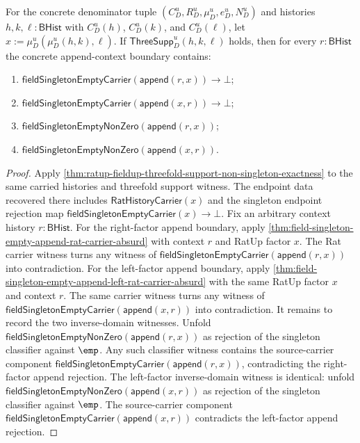 \begin{theorem}
\label{thm:ratup-fieldup-threefold-support-contextual-nonzero-boundary}
For the concrete denominator tuple $(C_D^u,R_D^u,\mu_D^u,e_D^u,N_D^u)$ and histories $h,k,\ell:\mathsf{BHist}$ with $C_D^u(h)$, $C_D^u(k)$, and
$C_D^u(\ell)$, let $x:=\mu_D^u(\mu_D^u(h,k),\ell)$. If
$\mathsf{ThreeSupp}_D^u(h,k,\ell)$ holds, then for every $r:\mathsf{BHist}$ the
concrete append-context boundary contains:
\begin{enumerate}
  \item $\mathsf{fieldSingletonEmptyCarrier}(\mathsf{append}(r,x))\to\bot$;
  \item $\mathsf{fieldSingletonEmptyCarrier}(\mathsf{append}(x,r))\to\bot$;
  \item $\mathsf{fieldSingletonEmptyNonZero}(\mathsf{append}(r,x))$;
  \item $\mathsf{fieldSingletonEmptyNonZero}(\mathsf{append}(x,r))$.
\end{enumerate}
\end{theorem}
\begin{proof}
Apply
\autoref{thm:ratup-fieldup-threefold-support-non-singleton-exactness} to the same carried histories and threefold support witness. The endpoint data recovered
there includes $\mathsf{RatHistoryCarrier}(x)$ and the singleton endpoint
rejection map $\mathsf{fieldSingletonEmptyCarrier}(x)\to\bot$.
Fix an arbitrary context history $r:\mathsf{BHist}$. For the right-factor append
boundary, apply \autoref{thm:field-singleton-empty-append-rat-carrier-absurd}
with context $r$ and RatUp factor $x$. The Rat carrier witness turns any witness of
$\mathsf{fieldSingletonEmptyCarrier}(\mathsf{append}(r,x))$ into
contradiction.
For the left-factor append boundary, apply
\autoref{thm:field-singleton-empty-append-left-rat-carrier-absurd} with the same
RatUp factor $x$ and context $r$. The same carrier witness turns any witness of
$\mathsf{fieldSingletonEmptyCarrier}(\mathsf{append}(x,r))$ into
contradiction.
It remains to record the two inverse-domain witnesses. Unfold
$\mathsf{fieldSingletonEmptyNonZero}(\mathsf{append}(r,x))$ as rejection of the
singleton classifier against $\emp$. Any such classifier witness contains the
source-carrier component
$\mathsf{fieldSingletonEmptyCarrier}(\mathsf{append}(r,x))$, contradicting the
right-factor append rejection.
The left-factor inverse-domain witness is identical: unfold
$\mathsf{fieldSingletonEmptyNonZero}(\mathsf{append}(x,r))$ as rejection of
the singleton classifier against $\emp$. The source-carrier component
$\mathsf{fieldSingletonEmptyCarrier}(\mathsf{append}(x,r))$ contradicts the
left-factor append rejection.
\end{proof}

